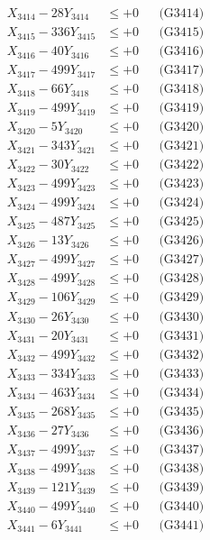 \documentclass[a4paper,10pt]{article}
\begin{document}
{\begin{align}
X_{3414} - 28Y_{3414} &\leq +0 && \text{(G3414)} \\
X_{3415} - 336Y_{3415} &\leq +0 && \text{(G3415)} \\
X_{3416} - 40Y_{3416} &\leq +0 && \text{(G3416)} \\
X_{3417} - 499Y_{3417} &\leq +0 && \text{(G3417)} \\
X_{3418} - 66Y_{3418} &\leq +0 && \text{(G3418)} \\
X_{3419} - 499Y_{3419} &\leq +0 && \text{(G3419)} \\
X_{3420} - 5Y_{3420} &\leq +0 && \text{(G3420)} \\
\allowbreak
X_{3421} - 343Y_{3421} &\leq +0 && \text{(G3421)} \\
X_{3422} - 30Y_{3422} &\leq +0 && \text{(G3422)} \\
X_{3423} - 499Y_{3423} &\leq +0 && \text{(G3423)} \\
X_{3424} - 499Y_{3424} &\leq +0 && \text{(G3424)} \\
X_{3425} - 487Y_{3425} &\leq +0 && \text{(G3425)} \\
X_{3426} - 13Y_{3426} &\leq +0 && \text{(G3426)} \\
X_{3427} - 499Y_{3427} &\leq +0 && \text{(G3427)} \\
X_{3428} - 499Y_{3428} &\leq +0 && \text{(G3428)} \\
X_{3429} - 106Y_{3429} &\leq +0 && \text{(G3429)} \\
X_{3430} - 26Y_{3430} &\leq +0 && \text{(G3430)} \\
\allowbreak
X_{3431} - 20Y_{3431} &\leq +0 && \text{(G3431)} \\
X_{3432} - 499Y_{3432} &\leq +0 && \text{(G3432)} \\
X_{3433} - 334Y_{3433} &\leq +0 && \text{(G3433)} \\
X_{3434} - 463Y_{3434} &\leq +0 && \text{(G3434)} \\
X_{3435} - 268Y_{3435} &\leq +0 && \text{(G3435)} \\
X_{3436} - 27Y_{3436} &\leq +0 && \text{(G3436)} \\
X_{3437} - 499Y_{3437} &\leq +0 && \text{(G3437)} \\
X_{3438} - 499Y_{3438} &\leq +0 && \text{(G3438)} \\
X_{3439} - 121Y_{3439} &\leq +0 && \text{(G3439)} \\
X_{3440} - 499Y_{3440} &\leq +0 && \text{(G3440)} \\
\allowbreak
X_{3441} - 6Y_{3441} &\leq +0 && \text{(G3441)} \\

\end{align}}
\end{document}
